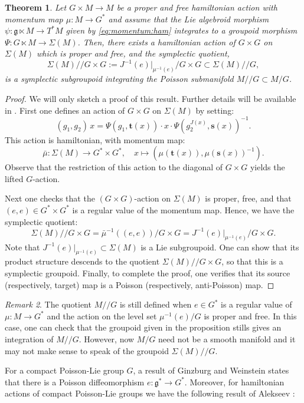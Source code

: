 \documentclass[a4paper,11pt]{amsart}
\newtheorem{thm}{Theorem}[section]
\theoremstyle{definition}
\theoremstyle{remark}
\newtheorem{rem}[thm]{Remark}
\begin{document}
\begin{thm}
Let $G\times M\to M$ be a proper and free hamiltonian action with momentum map $\mu:M\to G^*$ and assume that
the Lie algebroid morphism $\psi:{\mathfrak{g}}\ltimes M\to T^*M$ given by \eqref{eq:momentum:ham} integrates to a groupoid
morphism $\Psi:G\ltimes M\to \Sigma(M)$. Then, there exists a hamiltonian action of $G\times G$ on $\Sigma(M)$
which is proper and free, and the symplectic quotient,
\[ \Sigma(M)//G\times G:=J^{-1}(e)|_{\mu^{-1}(e)}/G\times G \subset \Sigma(M)//G, \]
is a symplectic subgroupoid integrating the Poisson
submanifold $M//G\subset M/G$.
\end{thm}

\begin{proof}
We will only sketch a proof of this result. Further details will
be available in \cite{FP}.  First one defines an action of
$G\times G$ on $\Sigma(M)$ by setting:
\[ (g_1,g_2)\,x=\Psi(g_1,{\mathbf{t}}(x))\cdot x\cdot \Psi(g_2^{J(x)},{\mathbf{s}}(x))^{-1}. \]
This action is hamiltonian, with momentum map:
\[ \bar{\mu}:\Sigma(M)\to G^*\times G^*,\quad x\mapsto (\mu({\mathbf{t}}(x)),\mu({\mathbf{s}}(x))^{-1}).\]
Observe that the restriction of this action to the diagonal of $G\times G$ yields the lifted $G$-action.

Next one checks that the $(G\times G)$-action on $\Sigma(M)$ is proper, free, and that $(e,e)\in G^*\times G^*$
is a regular value of the momentum map. Hence, we have the symplectic quotient:
\[ \Sigma(M)//G\times G=\bar{\mu}^{-1}((e,e))/G\times G=J^{-1}(e)|_{\mu^{-1}(e)}/G\times G.\]
Note that $J^{-1}(e)|_{\mu^{-1}(e)}\subset \Sigma(M)$ is a Lie subgroupoid. One can show that its product
structure descends to the quotient $\Sigma(M)//G\times G$, so that this is a symplectic groupoid. Finally, to
complete the proof, one verifies that its source (respectively, target) map is a Poisson (respectively,
anti-Poisson) map.
\end{proof}

\begin{rem}
The quotient $M//G$ is still defined when $e\in G^*$ is a regular value of $\mu:M\to G^*$ and the action
on the level set $\mu^{-1}(e)/G$ is proper and free. In this case, one can check that the groupoid given
in the proposition stills gives an integration of $M//G$. However, now $M/G$ need not be a smooth manifold
and it may not make sense to speak of the groupoid $\Sigma(M)//G$.
\end{rem}

For a compact Poisson-Lie group $G$, a result of Ginzburg and
Weinstein \cite{GiWe} states that there is a Poisson
diffeomorphism $e:{\mathfrak{g}}^*\to G^*$. Moreover, for hamiltonian actions
of compact Poisson-Lie groups we have the following result of
Alekseev \cite{Alek}:
\end{document}
